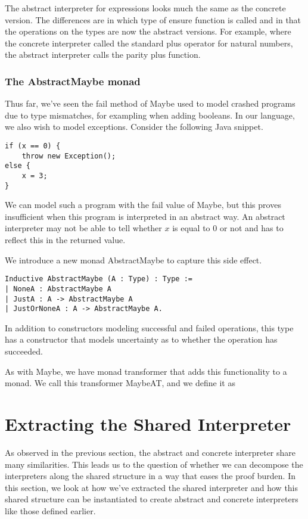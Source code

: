The abstract interpreter for expressions looks much the same as the concrete
version. The differences are in which type of ensure function is called and in
that the operations on the types are now the abstract versions. For example,
where the concrete interpreter called the standard plus operator for natural
numbers, the abstract interpreter calls the parity plus function.

\subsubsection{The AbstractMaybe monad}
Thus far, we've seen the fail method of Maybe used to model crashed programs
due to type mismatches, for exampling when adding booleans. In our language, we
also wish to model exceptions. Consider the following Java snippet.

\begin{verbatim}
if (x == 0) {
    throw new Exception();
else {
    x = 3;
}
\end{verbatim}

We can model such a program with the fail value of Maybe, but this proves
insufficient when this program is interpreted in an abstract way. An abstract
interpreter may not be able to tell whether $x$ is equal to $0$ or not and has
to reflect this in the returned value.

We introduce a new monad AbstractMaybe to capture this side effect.

\begin{listing}[H]
\begin{verbatim}
Inductive AbstractMaybe (A : Type) : Type :=
| NoneA : AbstractMaybe A
| JustA : A -> AbstractMaybe A
| JustOrNoneA : A -> AbstractMaybe A.
\end{verbatim}
\end{listing}

In addition to constructors modeling successful and failed operations, this
type has a constructor that models uncertainty as to whether the operation has
succeeded.

As with Maybe, we have monad transformer that adds this functionality to a
monad. We call this transformer MaybeAT, and we define it as \\

\section{Extracting the Shared Interpreter}\label{sec:shared_interpreter}
As observed in the previous section, the abstract and concrete interpreter
share many similarities. This leads us to the question of whether we can
decompose the interpreters along the shared structure in a way that eases the
proof burden. In this section, we look at how we've extracted the shared
interpreter and how this shared structure can be instantiated to create
abstract and concrete interpreters like those defined earlier.

